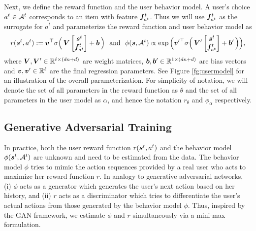\documentclass{article} %
\newcommand{\xc}[1]{{\color{blue}{\bf\sf #1}}}
\begin{document}
Next, we define the reward function and the user behavior model. A user's choice $a^t\in {\mathcal{A}}^t$ corresponds to an item with feature ${\bm{f}}_{a^t}^t$. Thus we will use ${\bm{f}}_{a^t}^t$ as the surrogate for $a^t$ and parameterize the reward function and user behavior model as 
\begin{equation}
    r({\bm{s}}^t, a^t) := {\bm{v}}^\top \sigma \Big(\, {\bm{V}} \left[
    \begin{matrix}
        {\bm{s}}^t \cr
        {\bm{f}}_{a^t}^t
    \end{matrix}
    \right] + {\bm{b}} \, \Big)~~\text{and}~~
    \phi({\bm{s}},{\mathcal{A}}^t) \propto \exp\Big( 
    {{\bm{v}}'}^{\top} \sigma \Big(\, {\bm{V}}' \left[
    \begin{matrix}
        {\bm{s}}^t \cr
        {\bm{f}}_{a^t}^t
    \end{matrix}
    \right] + {\bm{b}}' \, \Big)    
    \Big), 
\end{equation}
where {\small${\bm{V}},{\bm{V}}' \in {\mathbb{R}}^{\ell \times (dn+d)}$} are weight matrices, {\small${\bm{b}},{\bm{b}}' \in {\mathbb{R}}^{ 1 \times (dn+d)}$} are bias vectors \xc{,} and {\small${\bm{v}},{\bm{v}}' \in {\mathbb{R}}^{\ell}$} are the final regression parameters. See Figure \ref{fg:usermodel} for an illustration of the overall parameterization. For simplicity of notation, we will denote the set of all parameters in the reward function as $\theta$ and the set of all parameters in the user model as $\alpha$, and hence the notation $r_\theta$ and $\phi_\alpha$ respectively.    

\vspace{-3mm}
\subsection{Generative Adversarial Training}
\label{sec:gan_training}
\vspace{-2mm}

In practice, both the user reward function $r({\bm{s}}^t,a^t)$ and the behavior model $\phi({\bm{s}}^t, {\mathcal{A}}^t)$ are unknown and need to be estimated from the data. The behavior model $\phi$ tries to mimic the action sequences provided by a real user who acts to maximize her reward function $r$. In analogy to generative adversarial networks, (i) $\phi$ acts as a generator which generates the user's next action based on her history, and (ii) $r$ acts as a discriminator which tries to differentiate the user's actual actions from those generated by the behavior model $\phi$. Thus, inspired by the {\small GAN} framework, we estimate $\phi$ and $r$ simultaneously via a mini-max formulation. 
\end{document}
